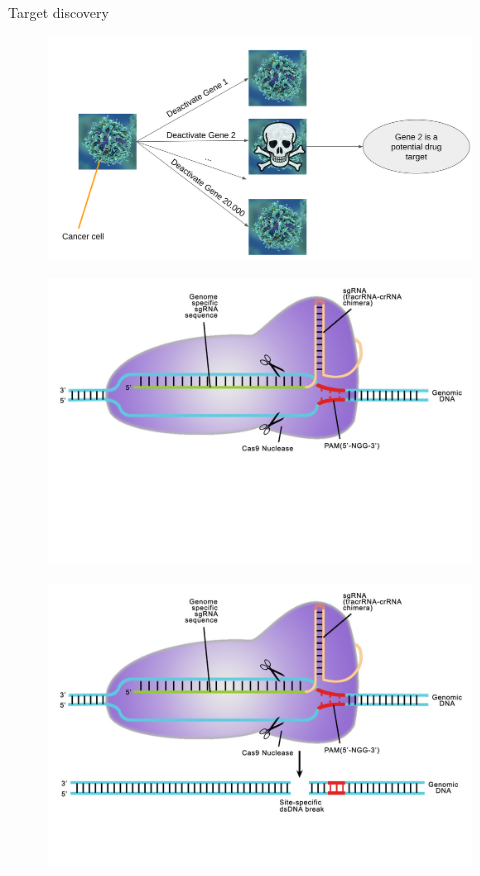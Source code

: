 \documentclass[Nike]{tuberlinbeamer}
\begin{document}
\begin{frame}{Target discovery}
  \begin{figure}
    \includegraphics[width=\linewidth]{targetdiscovery.png}
  \end{figure}
\end{frame}
\begin{frame}
  \begin{figure}
    \includegraphics[width=0.85\linewidth,left]{Doudna-art-crop-upper.jpg}
  \end{figure}
\end{frame}


\begin{frame}
  \begin{figure}
    \includegraphics[width=0.85\linewidth,left]{Doudna-art-crop.jpg}
  \end{figure}
\end{frame}
\end{document}
